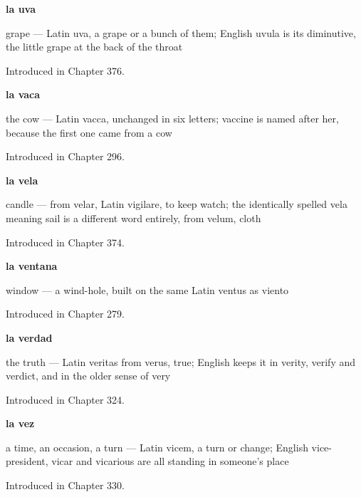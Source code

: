 \noindent\begin{minipage}[t]{\linewidth}
\raggedright
\textbf{la uva}\par
\small grape — Latin uva, a grape or a bunch of them; English uvula is its diminutive, the little grape at the back of the throat\par
\footnotesize Introduced in Chapter 376.
\end{minipage}\par\medskip

\noindent\begin{minipage}[t]{\linewidth}
\raggedright
\textbf{la vaca}\par
\small the cow — Latin vacca, unchanged in six letters; vaccine is named after her, because the first one came from a cow\par
\footnotesize Introduced in Chapter 296.
\end{minipage}\par\medskip

\noindent\begin{minipage}[t]{\linewidth}
\raggedright
\textbf{la vela}\par
\small candle — from velar, Latin vigilare, to keep watch; the identically spelled vela meaning sail is a different word entirely, from velum, cloth\par
\footnotesize Introduced in Chapter 374.
\end{minipage}\par\medskip

\noindent\begin{minipage}[t]{\linewidth}
\raggedright
\textbf{la ventana}\par
\small window — a wind-hole, built on the same Latin ventus as viento\par
\footnotesize Introduced in Chapter 279.
\end{minipage}\par\medskip

\noindent\begin{minipage}[t]{\linewidth}
\raggedright
\textbf{la verdad}\par
\small the truth — Latin veritas from verus, true; English keeps it in verity, verify and verdict, and in the older sense of very\par
\footnotesize Introduced in Chapter 324.
\end{minipage}\par\medskip

\noindent\begin{minipage}[t]{\linewidth}
\raggedright
\textbf{la vez}\par
\small a time, an occasion, a turn — Latin vicem, a turn or change; English vice-president, vicar and vicarious are all standing in someone's place\par
\footnotesize Introduced in Chapter 330.
\end{minipage}\par\medskip

